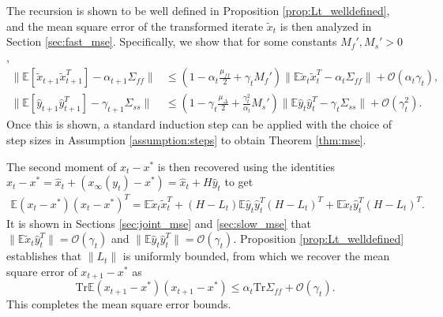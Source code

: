 The recursion is shown to be well defined in Proposition \ref{prop:Lt_welldefined}, and the mean square error of the transformed iterate $\tilde{x}_t$ is then analyzed in Section \ref{sec:fast_mse}. 
Specifically, we show that for some constants $M_f', M_s' > 0$, 
\begin{equation}
    \begin{split}
        \lVert \mathbb{E} [\tilde{x}_{t+1} \tilde{x}_{t+1}^T ] - \alpha_{t+1} \Sigma_{ff} \rVert &\leq \left(1 - \alpha_t \frac{\mu_{ff}}{2} + \gamma_t M_f'\right) \lVert \mathbb{E} \tilde{x}_t \tilde{x}_t^T - \alpha_t \Sigma_{ff} \rVert + \mathcal{O}\left(\alpha_t \gamma_t \right)
            , 
        \\ 
        \lVert \mathbb{E} [\hat{y}_{t+1} \hat{y}_{t+1}^T ] - \gamma_{t+1} \Sigma_{ss} \rVert &\leq \left(1 - \gamma_t \frac{\mu_\Delta}{2} + \frac{\gamma_t^2}{\alpha_t} M_s'\right) \lVert \mathbb{E}\hat{y}_t \hat{y}_t^T - \gamma_t \Sigma_{ss} \rVert + \mathcal{O}\left(\gamma_t^2\right) .
    \end{split}
\end{equation}
Once this is shown, a standard induction step can be applied with the choice of step sizes in Assumption \ref{assumption:steps} to obtain Theorem \ref{thm:mse}.


The second moment of $x_t - x^*$ is then recovered using the identities $x_t - x^* = \hat{x}_t + (x_\infty (y_t) - x^*) = \hat{x}_t + H \hat{y}_t$ to get
\begin{align*}
    \mathbb{E}\left(x_t - x^*\right) \left(x_t - x^* \right)^T 
    = \mathbb{E} \tilde{x}_t \tilde{x}_t^T
    + (H - L_t ) \mathbb{E} \hat{y}_t \hat{y}_t^T (H - L_t)^T
    + \mathbb{E} \tilde{x}_t \hat{y}_t^T (H - L_t)^T .    
\end{align*}
It is shown in Sections \ref{sec:joint_mse} and \ref{sec:slow_mse} that $\lVert \mathbb{E} \tilde{x}_t \hat{y}_t^T \rVert = \mathcal{O}(\gamma_t)$ and $\lVert \mathbb{E} \hat{y}_t \hat{y}_t^T \rVert = \mathcal{O}(\gamma_t)$.
Proposition \ref{prop:Lt_welldefined} establishes that $\lVert L_t \rVert$ is uniformly bounded, from which we recover the mean square error of $x_{t+1} - x^*$ as
\begin{equation}\label{eq:fast_notransformation_mse}
    \mathrm{Tr} \mathbb{E} (x_{t+1} - x^*) (x_{t+1} - x^*) 
    \leq
    \alpha_t \mathrm{Tr} \Sigma_{ff} 
    + \mathcal{O}\left(\gamma_t \right) .
\end{equation}
This completes the mean square error bounds. 



